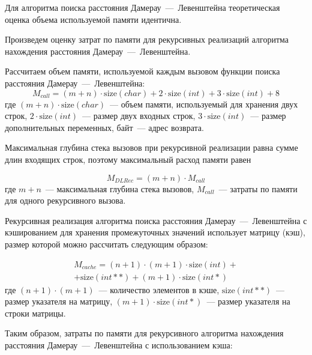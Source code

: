 Для алгоритма поиска расстояния Дамерау~---~Левенштейна теоретическая оценка объема используемой памяти идентична.

Произведем оценку затрат по памяти для рекурсивных реализаций алгоритма нахождения расстояния Дамерау~---~Левенштейна.

Рассчитаем объем памяти, используемой каждым вызовом функции поиска расстояния Дамерау~---~Левенштейна:
\begin{equation}
    M_{call} = (m + n) \cdot \text{size}(char) + 2 \cdot \text{size}(int) + 3 \cdot \text{size}(int) + 8
\end{equation}
где $(m + n) \cdot \text{size}(char)$~--- объем памяти, используемый для хранения двух строк,
\newline $2 \cdot \text{size}(int)$~--- размер двух входных строк,
\newline $3 \cdot \text{size}(int)$~--- размер дополнительных переменных,
 байт~--- адрес возврата.

Максимальная глубина стека вызовов при рекурсивной реализации равна сумме длин входящих строк, поэтому максимальный расход памяти равен

\begin{equation}
    M_{DLRec} = (m + n) \cdot M_{call}
\end{equation}
где $m + n$~--- максимальная глубина стека вызовов,
\newline $M_{call}$~--- затраты по памяти для одного рекурсивного вызова.

Рекурсивная реализация алгоритма поиска расстояния Дамерау~---~Левенштейна с кэшированием для хранения промежуточных значений использует матрицу (кэш), размер которой можно рассчитать следующим образом:

\begin{multline}
	M_{cache} = (n + 1) \cdot (m + 1) \cdot \text{size}(int) +\\+ \text{size}(int **) + (m + 1) \cdot \text{size}(int *)
\end{multline}
где $(n + 1) \cdot (m + 1)$~--- количество элементов в кэше,
\newline $\text{size}(int **)$~--- размер указателя на матрицу,
\newline $(m + 1) \cdot \text{size}(int *)$~--- размер указателя на строки матрицы.

Таким образом, затраты по памяти для рекурсивного алгоритма нахождения расстояния Дамерау~---~Левенштейна с использованием кэша:

